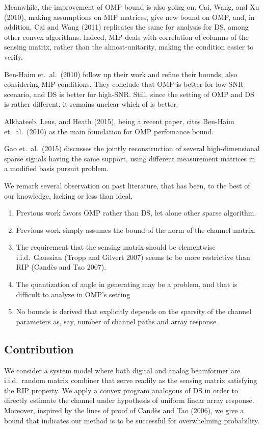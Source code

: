 Meanwhile, the improvement of OMP bound is also going on.
Cai, Wang, and Xu (2010), making assumptions on MIP matrices, give new bound on OMP, and, in addition, Cai and Wang (2011) replicates the same for analysis for DS, among other convex algorithms.
Indeed, MIP deals with correlation of columns of the sensing matrix, rather than the almost-unitarity, making the condition easier to verify.

Ben-Haim et.\ al.\ (2010) follow up their work and refine their bounds, also considering MIP conditions.
They conclude that OMP is better for low-SNR scenario, and DS is better for high-SNR.
Still, since the setting of OMP and DS is rather different, it remains unclear which of is better.

Alkhateeb, Leus, and Heath (2015), being a recent paper, cites Ben-Haim et.\ al.\ (2010) as the main foundation for OMP perfomance bound.

Gao et.\ al.\ (2015) discusses the jointly reconstruction of several high-dimensional sparse signals having the same support, using different measurement matrices in a modified basis pursuit problem.

We remark several observation on past literature, that has been, to the best of our knowledge, lacking or less than ideal.

\begin{enumerate}
\item Previous work favors OMP rather than DS, let alone other sparse algorithm.
\item Previous work simply assumes the bound of the norm of the channel matrix.
\item The requirement that the sensing matrix should be elementwise i.i.d.\ Gaussian (Tropp and Gilvert 2007) seems to be more restrictive than RIP (Cand\`es and Tao 2007).
\item The quantization of angle in generating may be a problem, and that is difficult to analyze in OMP's setting
\item No bounds is derived that explicitly depends on the sparsity of the channel parameters as, say, number of channel paths and array response.
\end{enumerate}

\subsection{Contribution}

We consider a system model where both digital and analog beamformer are i.i.d.\ random matrix combiner that serve readily as the sensing matrix satisfying the RIP property.
We apply a convex program analogous of DS in order to directly estimate the channel under hypothesis of uniform linear array response.
Moreover, inspired by the lines of proof of Cand\`es and Tao (2006), we give a bound that indicates our method is to be successful for overwhelming probability.

